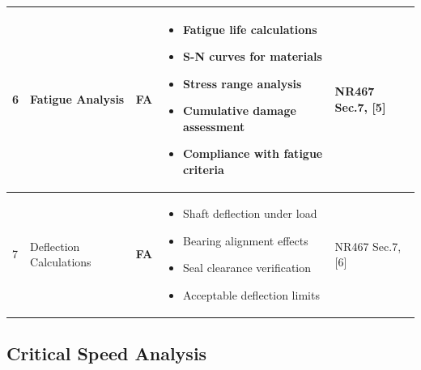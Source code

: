\documentclass[11pt,a4paper]{report}
\newcommand{\fa}{\textbf{\textcolor{warningred}{FA}}}
\begin{document}
\begin{longtable}{|p{0.5cm}|p{5cm}|p{1.5cm}|p{5.5cm}|p{2cm}|}
6 & Fatigue Analysis & \fa{} & 
\begin{itemize}[leftmargin=*,nosep]
\item Fatigue life calculations
\item S-N curves for materials
\item Stress range analysis
\item Cumulative damage assessment
\item Compliance with fatigue criteria
\end{itemize} & NR467 Sec.7, [5] \\
\hline

7 & Deflection Calculations & \fa{} & 
\begin{itemize}[leftmargin=*,nosep]
\item Shaft deflection under load
\item Bearing alignment effects
\item Seal clearance verification
\item Acceptable deflection limits
\end{itemize} & NR467 Sec.7, [6] \\
\hline

\end{longtable}

\subsection{Critical Speed Analysis}
\end{document}
